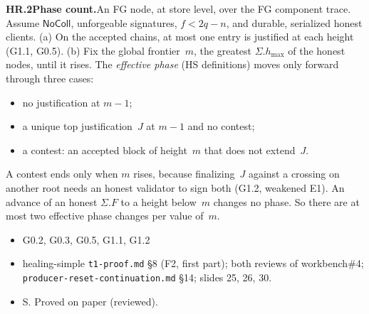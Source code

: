 \documentclass{article}
\newcommand{\hmax}{h_{\max}}
\newcommand{\dagnode}[6]{%
\par\medskip\noindent\textbf{#1\enspace #2.}\enspace #3
\begin{itemize}[leftmargin=2.2em,itemsep=0pt,topsep=2pt]
\item[\emph{Uses}] #4
\item[\emph{Evid.}] #5
\item[\emph{Task}] #6
\end{itemize}}
\begin{document}
\dagnode{HR.2}{Phase count}{An FG node, at store level, over the FG
component trace.  Assume $\mathsf{NoColl}$, unforgeable signatures,
$f<2q-n$, and durable, serialized honest clients.
(a) On the accepted chains, at most one entry is justified at each height
(G1.1, G0.5).
(b) Fix the global frontier~$m$, the greatest $\Sigma.\hmax$ of the honest
nodes, until it rises.  The \emph{effective phase} (HS definitions) moves
only forward through three cases:
\begin{itemize}[itemsep=0pt,topsep=2pt]
\item no justification at $m-1$;
\item a unique top justification~$J$ at $m-1$ and no contest;
\item a contest: an accepted block of height~$m$ that does not extend~$J$.
\end{itemize}
A contest ends only when $m$ rises, because finalizing~$J$ against a
crossing on another root needs an honest validator to sign both (G1.2,
weakened E1).  An advance of an honest $\Sigma.F$ to a height below~$m$
changes no phase.  So there are at most two effective phase changes per value
of~$m$.}
{G0.2, G0.3, G0.5, G1.1, G1.2}
{healing-simple \texttt{t1-proof.md} \S8 (F2, first part); both reviews of
workbench\#4; \texttt{producer-reset-continuation.md} \S14; slides 25, 26, 30.}
{S.  Proved on paper (reviewed).}
\end{document}

